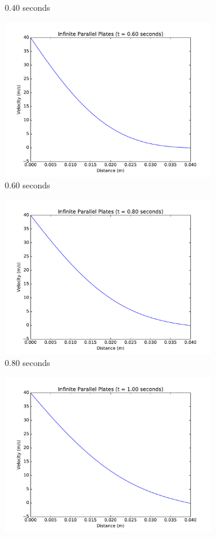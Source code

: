 \documentclass[addpoints]{exam}
\begin{document}
\begin{questions}
\begin{parts}
\begin{solution}
\begin{figure}[H]
\begin{subfigure}{.5\textwidth}
  \caption{$0.40$ seconds}
  \label{fig:0.4_forward}
\end{subfigure}
\begin{subfigure}{.5\textwidth}
  \centering
  \includegraphics[width=.8\linewidth]{figs/0-60_sec_plot_FIT.pdf}
  \caption{$0.60$ seconds}
  \label{fig:0.6_forward}
\end{subfigure}
\begin{subfigure}{.5\textwidth}
  \centering
  \includegraphics[width=.8\linewidth]{figs/0-80_sec_plot_FIT.pdf}
  \caption{$0.80$ seconds}
  \label{fig:0.8_forward}
\end{subfigure}
\begin{subfigure}{.5\textwidth}
  \centering
  \includegraphics[width=.8\linewidth]{figs/1-00_sec_plot_FIT.pdf}

\end{subfigure}
\end{figure}
\end{solution}
\end{parts}
\end{questions}
\end{document}
